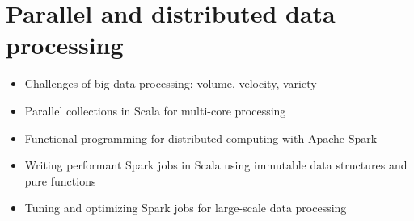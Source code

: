 \chapter{Parallel and distributed data processing }


\begin{itemize}
    \item Challenges of big data processing: volume, velocity, variety
    \item Parallel collections in Scala for multi-core processing
    \item Functional programming for distributed computing with Apache Spark
    \item Writing performant Spark jobs in Scala using immutable data structures and pure functions
    \item Tuning and optimizing Spark jobs for large-scale data processing
\end{itemize}